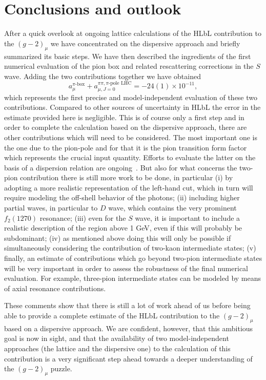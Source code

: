 \documentclass[epj]{webofc}
\newcommand{\<}{\langle}
\renewcommand{\>}{\rangle}
\begin{document}
\section{Conclusions and outlook}\label{concl}
After a quick overlook at ongoing lattice calculations of the
HLbL contribution to the $(g-2)_\mu$ we have concentrated on the dispersive
approach and briefly summarized its basic steps. We have then described the
ingredients of the first numerical evaluation of the pion box and related
rescattering corrections in the $S$ wave. Adding the two contributions
together we have obtained 
\begin{equation}
a_\mu^{\pi\text{-box}} + a_{\mu,J=0}^{\pi\pi,\pi\text{-pole
    LHC}}=-24(1)\times 10^{-11}, 
\end{equation}
which represents the first precise and model-independent evaluation of
these two contributions. Compared to other sources of uncertainty in HLbL
the error in the estimate provided here is negligible. This is of course
only a first step and in order to complete the calculation based on the
dispersive approach, there are other contributions which will need to be
considered. The most important one is the one due to the pion-pole and for
that it is the pion transition form factor which represents the crucial
input quantity. Efforts to evaluate the latter on the basis of a dispersion
relation are ongoing~\cite{Hoferichter:2014vra}. But also for what concerns
the two-pion contribution there is still more work to be done, in
particular (i) by adopting a more realistic representation of the left-hand
cut, which in turn will require modeling the off-shell behavior of the
photons; (ii) including higher partial waves, in particular to $D$ wave,
which contains the very prominent $f_2(1270)$ resonance; (iii) even for the
$S$ wave, it is important to include a realistic description of the region
above 1 GeV, even if this will probably be subdominant; (iv) as mentioned
above doing this will only be possible if simultaneously considering the
contribution of two-kaon intermediate states; (v) finally, an estimate of 
contributions which go beyond two-pion intermediate states will be very
important in order to assess the robustness of the final numerical
evaluation. For example, three-pion intermediate states can be modeled by
means of axial resonance contributions.

These comments show that there is still a lot of work ahead of us before
being able to provide a complete estimate of the HLbL contribution to the
$(g-2)_\mu$ based on a dispersive approach. We are confident, however, that
this ambitious goal is now in sight, and that the availability of two
model-independent approaches (the lattice and the dispersive one) to the
calculation of this contribution is a very significant step ahead towards a
deeper understanding of the $(g-2)_\mu$ puzzle.
\end{document}
